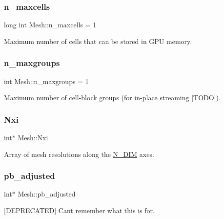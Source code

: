 \subsubsection{\texorpdfstring{n\+\_\+maxcells}{n\_maxcells}}
{\footnotesize\ttfamily long int Mesh\+::n\+\_\+maxcells = 1}



Maximum number of cells that can be stored in G\+PU memory. 

\mbox{\label{classMesh_a4e7bfac668bee06cb6c5fe49d92ea29b}} 
\subsubsection{\texorpdfstring{n\+\_\+maxgroups}{n\_maxgroups}}
{\footnotesize\ttfamily int Mesh\+::n\+\_\+maxgroups = 1}



Maximum number of cell-\/block groups (for in-\/place streaming \mbox{[}T\+O\+DO\mbox{]}). 

\mbox{\label{classMesh_a9f786ddddcfb54992075edb51784e9c8}} 
\subsubsection{\texorpdfstring{Nxi}{Nxi}}
{\footnotesize\ttfamily int$\ast$ Mesh\+::\+Nxi}



Array of mesh resolutions along the \hyperlink{cppspec_8h_a327d0faa306d7663502be8df312a815e}{N\+\_\+\+D\+IM} axes. 

\mbox{\label{classMesh_a18ec8295d5ad53439973008ac659348a}} 
\subsubsection{\texorpdfstring{pb\+\_\+adjusted}{pb\_adjusted}}
{\footnotesize\ttfamily int$\ast$ Mesh\+::pb\+\_\+adjusted}



\mbox{[}D\+E\+P\+R\+E\+C\+A\+T\+ED\mbox{]} Can\textquotesingle{}t remember what this is for. 

\mbox{\label{classMesh_a039c69a9dbffbad589dcfa8146101322}} 
